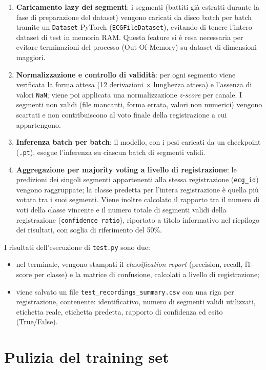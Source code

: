 \begin{enumerate}
	\item \textbf{Caricamento lazy dei segmenti}: i segmenti (battiti già estratti durante la fase di preparazione del dataset) vengono caricati da disco batch per batch tramite un \texttt{Dataset} PyTorch (\texttt{ECGFileDataset}), evitando di tenere l'intero dataset di test in memoria RAM. Questa feature si è resa necessaria per evitare terminazioni del processo (Out-Of-Memory) su dataset di dimensioni maggiori.
	\item \textbf{Normalizzazione e controllo di validità}: per ogni segmento viene verificata la forma attesa (12 derivazioni $\times$ lunghezza attesa) e l'assenza di valori \texttt{NaN}; viene poi applicata una normalizzazione \emph{z-score} per canale. I segmenti non validi (file mancanti, forma errata, valori non numerici) vengono scartati e non contribuiscono al voto finale della registrazione a cui appartengono.
	\item \textbf{Inferenza batch per batch}: il modello, con i pesi caricati da un checkpoint (\texttt{.pt}), esegue l'inferenza su ciascun batch di segmenti validi.
	\item \textbf{Aggregazione per majority voting a livello di registrazione}: le predizioni dei singoli segmenti appartenenti alla stessa registrazione (\texttt{ecg\_id}) vengono raggruppate; la classe predetta per l'intera registrazione è quella più votata tra i suoi segmenti. Viene inoltre calcolato il rapporto tra il numero di voti della classe vincente e il numero totale di segmenti validi della registrazione (\texttt{confidence\_ratio}), riportato a titolo informativo nel riepilogo dei risultati, con soglia di riferimento del 50\%.
\end{enumerate}

I risultati dell'esecuzione di \texttt{test.py} sono due:
\begin{itemize}
	\item nel terminale, vengono stampati il \emph{classification report} (precision, recall, f1-score per classe) e la matrice di confusione, calcolati a livello di registrazione;
	\item viene salvato un file \texttt{test\_recordings\_summary.csv} con una riga per registrazione, contenente: identificativo, numero di segmenti validi utilizzati, etichetta reale, etichetta predetta, rapporto di confidenza ed esito (True/False).
\end{itemize}

\section{Pulizia del training set}
\label{pulizia-dataset}

